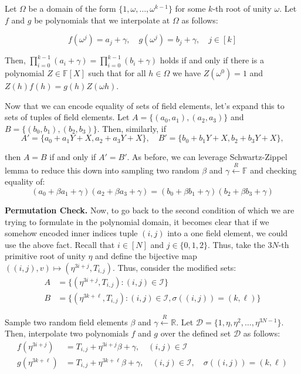 \documentclass[../lecture-notes.tex]{subfiles}
\begin{document}
Let $\Omega$ be a domain of the form \(\{1, \omega, \dots, \omega^{k-1}\}\) for
some $k$-th root of unity $\omega$. Let $f$ and $g$ be polynomials that we
interpolate at $\Omega$ as follows:

\begin{equation*}
    f(\omega^j) = a_j + \gamma, \quad g(\omega^j) = b_j + \gamma, \quad j \in [k]
\end{equation*}

Then, \(\prod_{i=0}^{k-1} (a_i + \gamma) = \prod_{i=0}^{k-1} (b_i + \gamma)\) holds if and only if there is a polynomial $Z \in \mathbb{F}[X]$ such that for all $h \in \Omega$ we have $Z(\omega^{0}) = 1$ and $Z(h)f(h) = g(h)Z(\omega h)$.

Now that we can encode equality of sets of field elements, let's expand this to sets of tuples of field elements. Let \(A = \{(a_0, a_1), (a_2, a_3)\}\) and \(B = \{(b_0, b_1), (b_2, b_3)\}\). Then, similarly, if
\[A' = \{a_0 + a_1Y + X, a_2 + a_3Y + X\}, \quad B' = \{b_0 + b_1Y + X, b_2 + b_3Y + X\},\]

then $A=B$ if and only if $A'=B'$. As before, we can leverage Schwartz-Zippel lemma to reduce this down into sampling two random $\beta$ and $\gamma \xleftarrow{R} \mathbb{F}$ and checking equality of:
\begin{equation*}
    (a_0 + \beta a_1 + \gamma)(a_2 + \beta a_3 + \gamma) = (b_0 + \beta b_1 + \gamma)(b_2 + \beta b_3 + \gamma)
\end{equation*}

\textbf{Permutation Check.} Now, to go back to the second condition of
 which we are trying to formulate in the polynomial
domain, it becomes clear that if we somehow encoded inner indices tuple $(i, j)$
into a one field element, we could use the above fact. Recall that $i \in [N]$
and $j \in \{0,1,2\}$. Thus, take the $3N$-th primitive root of unity $\eta$ and
define the bijective map $((i,j),v) \mapsto (\eta^{3i+j}, T_{i,j})$. Thus,
consider the modified sets:
\begin{align*}
    A &= \{(\eta^{3i+j}, T_{i,j}) : (i, j) \in \mathcal{I}\} \\
    B &= \{(\eta^{3k+\ell}, T_{i,j}) : (i, j) \in \mathcal{I}, \sigma((i, j)) = (k, \ell)\}
\end{align*}

Sample two random field elements $\beta$ and $\gamma \xleftarrow{R} \mathbb{R}$. Let $\mathcal{D} = \{1, \eta, \eta^2, \ldots, \eta^{3N-1}\}$. Then, interpolate two polynomials $f$ and $g$ over the defined set $\mathcal{D}$ as follows:
\begin{align*}
    f(\eta^{3i+j}) &= T_{i,j} + \eta^{3i+j}\beta + \gamma, \quad (i, j) \in \mathcal{I} \\
    g(\eta^{3k+\ell}) &= T_{i,j} + \eta^{3k+\ell}\beta + \gamma, \quad (i, j) \in \mathcal{I}, \quad \sigma((i, j)) = (k, \ell)
\end{align*}
\end{document}
